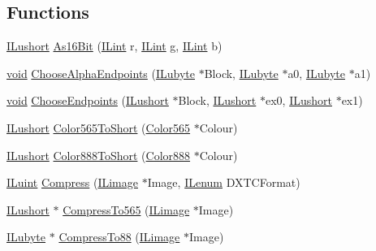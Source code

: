 \subsection*{Functions}
\begin{DoxyCompactItemize}
\item 
\hyperlink{il_8h_af6287b43748354a7c4864da43ae56962}{I\-Lushort} \hyperlink{il__dds-save_8c_aff797b11b001df26c11b0d14818254fe}{As16\-Bit} (\hyperlink{il_8h_a288a97fb9e92e707a60b749d0039fafe}{I\-Lint} r, \hyperlink{il_8h_a288a97fb9e92e707a60b749d0039fafe}{I\-Lint} g, \hyperlink{il_8h_a288a97fb9e92e707a60b749d0039fafe}{I\-Lint} b)
\item 
\hyperlink{il_8h_a5530e04d947bcddd83639ea7940faf10}{void} \hyperlink{il__dds-save_8c_a11484475cb7897df519bc0174ff0af35}{Choose\-Alpha\-Endpoints} (\hyperlink{il_8h_a8d2f04500100a86d1b00e98ab1b15a33}{I\-Lubyte} $\ast$Block, \hyperlink{il_8h_a8d2f04500100a86d1b00e98ab1b15a33}{I\-Lubyte} $\ast$a0, \hyperlink{il_8h_a8d2f04500100a86d1b00e98ab1b15a33}{I\-Lubyte} $\ast$a1)
\item 
\hyperlink{il_8h_a5530e04d947bcddd83639ea7940faf10}{void} \hyperlink{il__dds-save_8c_ac8514125ee73f3c0fbf0e723ec9addb9}{Choose\-Endpoints} (\hyperlink{il_8h_af6287b43748354a7c4864da43ae56962}{I\-Lushort} $\ast$Block, \hyperlink{il_8h_af6287b43748354a7c4864da43ae56962}{I\-Lushort} $\ast$ex0, \hyperlink{il_8h_af6287b43748354a7c4864da43ae56962}{I\-Lushort} $\ast$ex1)
\item 
\hyperlink{il_8h_af6287b43748354a7c4864da43ae56962}{I\-Lushort} \hyperlink{il__dds-save_8c_a67b6514d014fc5758f8181454d738af9}{Color565\-To\-Short} (\hyperlink{struct_color565}{Color565} $\ast$Colour)
\item 
\hyperlink{il_8h_af6287b43748354a7c4864da43ae56962}{I\-Lushort} \hyperlink{il__dds-save_8c_ab3a75ff476b2daf402ea9eae40127509}{Color888\-To\-Short} (\hyperlink{struct_color888}{Color888} $\ast$Colour)
\item 
\hyperlink{il_8h_ac6508d0e9c19e32f32e00d54b5b8cf30}{I\-Luint} \hyperlink{il__dds-save_8c_a926b832a37dd57a790a3361d8a94fbfd}{Compress} (\hyperlink{struct_i_limage}{I\-Limage} $\ast$Image, \hyperlink{il_8h_a1542f3a70c0c5370a30a1fa5ce349e2d}{I\-Lenum} D\-X\-T\-C\-Format)
\item 
\hyperlink{il_8h_af6287b43748354a7c4864da43ae56962}{I\-Lushort} $\ast$ \hyperlink{il__dds-save_8c_a2431ac8c3d9473cf6169eddef09f6fe7}{Compress\-To565} (\hyperlink{struct_i_limage}{I\-Limage} $\ast$Image)
\item 
\hyperlink{il_8h_a8d2f04500100a86d1b00e98ab1b15a33}{I\-Lubyte} $\ast$ \hyperlink{il__dds-save_8c_afa30ea353d9987d76d986249ef9f0642}{Compress\-To88} (\hyperlink{struct_i_limage}{I\-Limage} $\ast$Image)

\end{DoxyCompactItemize}
